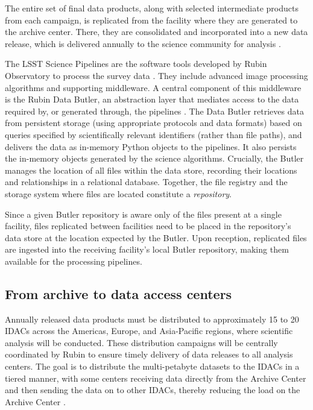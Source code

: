 \documentclass{webofc}
\begin{document}
The entire set of final data products, along with selected intermediate products from each campaign, is replicated from the facility where they are generated to the archive center. There, they are consolidated and incorporated into a new data release, which is delivered annually to the science community for analysis \cite{10.1051_epjconf_202429501042}.

The LSST Science Pipelines are the software tools developed by Rubin Observatory to process the survey data \cite{PSTN-019}. They include advanced image processing algorithms and supporting middleware. A central component of this middleware is the Rubin Data Butler, an abstraction layer that mediates access to the data required by, or generated through, the pipelines \cite{2022SPIE12189E..11J}. The Data Butler retrieves data from persistent storage (using appropriate protocols and data formats) based on queries specified by scientifically relevant identifiers (rather than file paths), and delivers the data as in-memory Python objects to the pipelines. It also persists the in-memory objects generated by the science algorithms. Crucially, the Butler manages the location of all files within the data store, recording their locations and relationships in a relational database. Together, the file registry and the storage system where files are located constitute a \emph{repository}.

Since a given Butler repository is aware only of the files present at a single facility, files replicated between facilities need to be placed in the repository's data store at the location expected by the Butler. Upon reception, replicated files are ingested into the receiving facility's local Butler repository, making them available for the processing pipelines.


\subsection{From archive to data access centers}
\label{summit-to-data-access-centers}

Annually released data products must be distributed to approximately 15 to 20 IDACs across the Americas, Europe, and Asia-Pacific regions, where scientific analysis will be conducted. These distribution campaigns will be centrally coordinated by Rubin to ensure timely delivery of data releases to all analysis centers. The goal is to distribute the multi-petabyte datasets to the IDACs in a tiered manner, with some centers receiving data directly from the Archive Center and then sending the data on to other IDACs, thereby reducing the load on the Archive Center \cite{RTN-086}.
\end{document}

